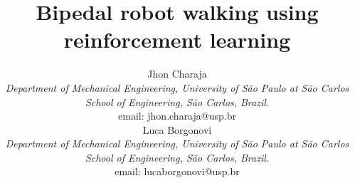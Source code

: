 \documentclass[conference]{IEEEtran}
\newcommand{\email}[1]{email: #1}
\begin{document}
\title{Bipedal robot walking using reinforcement learning}

\author{
\begin{minipage}{0.40\textwidth}
	\centering
	Jhon Charaja \\
	\small{\textit{Department of Mechanical Engineering, University of S\~ao Paulo at S\~ao Carlos School of Engineering, S\~ao Carlos, Brazil.} } \\
	\email{jhon.charaja@usp.br}
\end{minipage}
\hfill
\begin{minipage}{0.40\textwidth}
	\centering
	Luca Borgonovi \\
	\small{\textit{Department of Mechanical Engineering, University of S\~ao Paulo at S\~ao Carlos School of Engineering, S\~ao Carlos, Brazil.} } \\
	\email{lucaborgonovi@usp.br}
\end{minipage}
}
	
\maketitle










	
\end{document}
